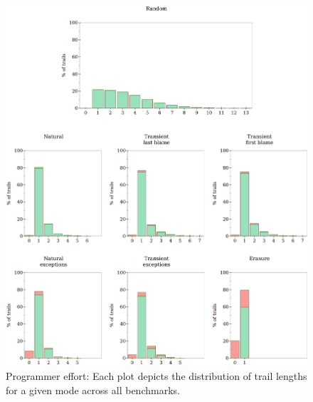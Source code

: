 \begin{figure}
  \centering
  \includegraphics[width=\textwidth]{./plots/bt-lengths-table}
  \caption{Programmer effort: Each plot depicts the distribution of trail
  lengths for a given mode across all benchmarks.}
  \label{fig:effort-table}
\end{figure}

